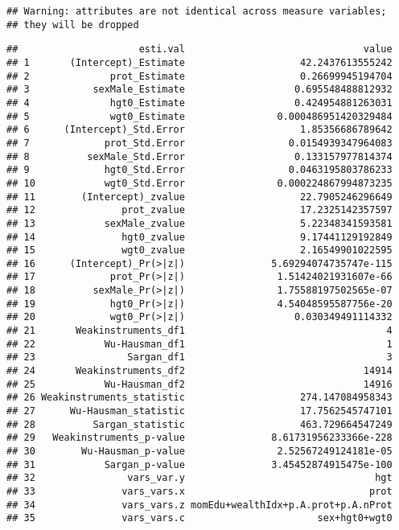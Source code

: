\documentclass[
]{book}
\begin{document}
\begin{verbatim}
## Warning: attributes are not identical across measure variables;
## they will be dropped
\end{verbatim}

\begin{verbatim}
##                     esti.val                               value
## 1       (Intercept)_Estimate                    42.2437613555242
## 2              prot_Estimate                    0.26699945194704
## 3           sexMale_Estimate                   0.695548488812932
## 4              hgt0_Estimate                   0.424954881263031
## 5              wgt0_Estimate                0.000486951420329484
## 6      (Intercept)_Std.Error                    1.85356686789642
## 7             prot_Std.Error                  0.0154939347964083
## 8          sexMale_Std.Error                   0.133157977814374
## 9             hgt0_Std.Error                  0.0463195803786233
## 10            wgt0_Std.Error                0.000224867994873235
## 11        (Intercept)_zvalue                    22.7905246296649
## 12               prot_zvalue                    17.2325142357597
## 13            sexMale_zvalue                    5.22348341593581
## 14               hgt0_zvalue                    9.17441129192849
## 15               wgt0_zvalue                    2.16549901022595
## 16      (Intercept)_Pr(>|z|)               5.69294074735747e-115
## 17             prot_Pr(>|z|)                1.51424021931607e-66
## 18          sexMale_Pr(>|z|)                1.75588197502565e-07
## 19             hgt0_Pr(>|z|)                4.54048595587756e-20
## 20             wgt0_Pr(>|z|)                   0.030349491114332
## 21       Weakinstruments_df1                                   4
## 22            Wu-Hausman_df1                                   1
## 23                Sargan_df1                                   3
## 24       Weakinstruments_df2                               14914
## 25            Wu-Hausman_df2                               14916
## 26 Weakinstruments_statistic                    274.147084958343
## 27      Wu-Hausman_statistic                    17.7562545747101
## 28          Sargan_statistic                    463.729664547249
## 29   Weakinstruments_p-value               8.61731956233366e-228
## 30        Wu-Hausman_p-value                2.52567249124181e-05
## 31            Sargan_p-value               3.45452874915475e-100
## 32                vars_var.y                                 hgt
## 33               vars_vars.x                                prot
## 34               vars_vars.z momEdu+wealthIdx+p.A.prot+p.A.nProt
## 35               vars_vars.c                       sex+hgt0+wgt0
\end{verbatim}
\end{document}
